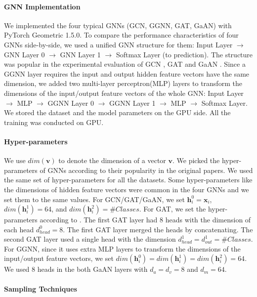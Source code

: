 \paragraph{GNN Implementation}
We implemented the four typical GNNs (GCN, GGNN, GAT, GaAN) with PyTorch Geometric 1.5.0.
To compare the performance characteristics of four GNNs side-by-side, we used a unified GNN structure for them: Input Layer $\rightarrow$ GNN Layer 0 $\rightarrow$ GNN Layer 1 $\rightarrow$ Softmax Layer (to prediction).
The structure was popular in the experimental evaluation of GCN \cite{kipf2017_gcn}, GAT \cite{huang2018_gat} and GaAN \cite{zhang2018_gaan}.
Since a GGNN layer requires the input and output hidden feature vectors have the same dimension, we added two multi-layer perceptron(MLP) layers to transform the dimensions of the input/output feature vectors of the whole GNN: Input Layer $\rightarrow$ MLP $\rightarrow$ GGNN Layer 0 $\rightarrow$ GGNN Layer 1 $\rightarrow$ MLP $\rightarrow$ Softmax Layer.
We stored the dataset and the model parameters on the GPU side.
All the training was conducted on GPU.

\paragraph{Hyper-parameters}
We use $dim(\boldsymbol{v})$ to denote the dimension of a vector $\boldsymbol{v}$.
We picked the hyper-parameters of GNNs according to their popularity in the original papers.
We used the same set of hyper-parameters for all the datasets. 
Some hyper-parameters like the dimensions of hidden feature vectors were common in the four GNNs and we set them to the same values.
For GCN/GAT/GaAN, we set $\boldsymbol{h}^0_i = \boldsymbol{x}_i$, $dim(\boldsymbol{h}^1_i)=64$, and $dim(\boldsymbol{h}^2_i)=\#Classes$.
For GAT, we set the hyper-parameters according to \cite{huang2018_gat}.
The first GAT layer had 8 heads with the dimension of each head $d^0_{head}=8$. The first GAT layer merged the heads by concatenating.
The second GAT layer used a single head with the dimension $d^1_{head}=d^1_{out}=\#Classes$.
For GGNN, since it uses extra MLP layers to transform the dimensions of the input/output feature vectors, we set $dim(\boldsymbol{h}^0_i) = dim(\boldsymbol{h}^1_i) = dim(\boldsymbol{h}^2_i) = 64$.
We used 8 heads in the both GaAN layers with $d_a=d_v=8$ and $d_m=64$.

\paragraph{Sampling Techniques}

